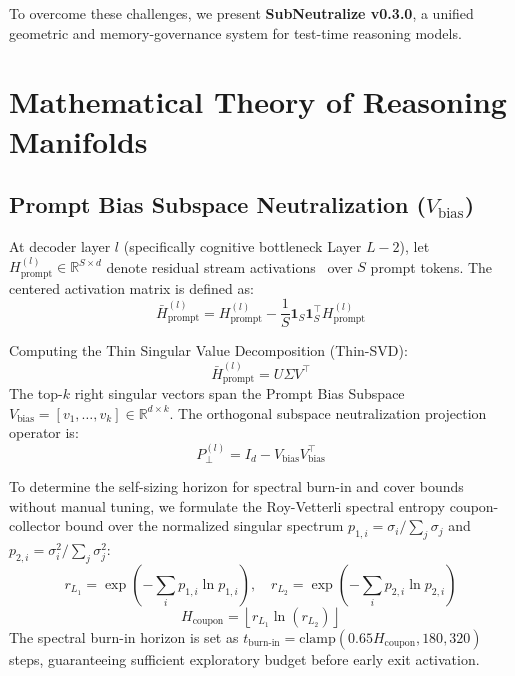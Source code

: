 \documentclass[10pt,twocolumn,letterpaper]{article}
\begin{document}
To overcome these challenges, we present \textbf{SubNeutralize v0.3.0}, a unified geometric and memory-governance system for test-time reasoning models.

\section{Mathematical Theory of Reasoning Manifolds}

\subsection{Prompt Bias Subspace Neutralization ($V_{\text{bias}}$)}
At decoder layer $l$ (specifically cognitive bottleneck Layer $L-2$), let $H_{\text{prompt}}^{(l)} \in \mathbb{R}^{S \times d}$ denote residual stream activations~\cite{elhage2021mathematical,nanda2023progress} over $S$ prompt tokens. The centered activation matrix is defined as:
\begin{equation}
\bar{H}_{\text{prompt}}^{(l)} = H_{\text{prompt}}^{(l)} - \frac{1}{S} \mathbf{1}_S \mathbf{1}_S^\top H_{\text{prompt}}^{(l)}
\end{equation}

Computing the Thin Singular Value Decomposition (Thin-SVD):
\begin{equation}
\bar{H}_{\text{prompt}}^{(l)} = U \Sigma V^\top
\end{equation}
The top-$k$ right singular vectors span the Prompt Bias Subspace $V_{\text{bias}} = [v_1, \dots, v_k] \in \mathbb{R}^{d \times k}$. The orthogonal subspace neutralization projection operator is:
\begin{equation}
P_{\perp}^{(l)} = I_d - V_{\text{bias}} V_{\text{bias}}^\top
\end{equation}

To determine the self-sizing horizon for spectral burn-in and cover bounds without manual tuning, we formulate the Roy-Vetterli spectral entropy coupon-collector bound over the normalized singular spectrum $p_{1, i} = \sigma_i / \sum_j \sigma_j$ and $p_{2, i} = \sigma_i^2 / \sum_j \sigma_j^2$:
\begin{equation}
r_{L_1} = \exp\left(-\sum_i p_{1, i} \ln p_{1, i}\right), \quad r_{L_2} = \exp\left(-\sum_i p_{2, i} \ln p_{2, i}\right)
\end{equation}
\begin{equation}
H_{\text{coupon}} = \left\lfloor r_{L_1} \ln(r_{L_2}) \right\rfloor
\end{equation}
The spectral burn-in horizon is set as $t_{\text{burn-in}} = \text{clamp}(0.65 H_{\text{coupon}}, 180, 320)$ steps, guaranteeing sufficient exploratory budget before early exit activation.
\end{document}
